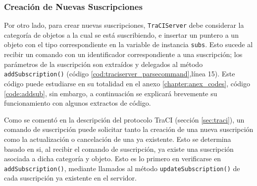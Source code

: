 

\subsubsection{Creación de Nuevas Suscripciones}

Por otro lado, para crear nuevas suscripciones, \texttt{TraCIServer} debe considerar la categoría de objetos a la cual se está suscribiendo, e insertar un puntero a un objeto con el tipo correspondiente en la variable de instancia \texttt{subs}. Esto sucede al recibir un comando con un identificador correspondiente a una suscripción; los parámetros de la suscripción son extraídos y delegados al método \texttt{addSubscription()} (código \ref{cod:traciserver_parsecommand},línea 15). Este código puede estudiarse en su totalidad en el anexo \ref{chapter:anex_codes}, código \ref{code:addsub}, sin embargo, a continuación se explicará brevemente su funcionamiento con algunos extractos de código.

Como se comentó en la descripción del protocolo TraCI (sección \ref{sec:traci}), un comando de suscripción puede solicitar tanto la creación de una nueva suscripción como la actualización o cancelación de una ya existente. Esto se determina basado en si, al recibir el comando de suscripción, ya existe una suscripción asociada a dicha categoría y objeto. Esto es lo primero en verificarse en \texttt{addSubscription()}, mediante llamados al método \texttt{updateSubscription()} de cada suscripción ya existente en el servidor.

